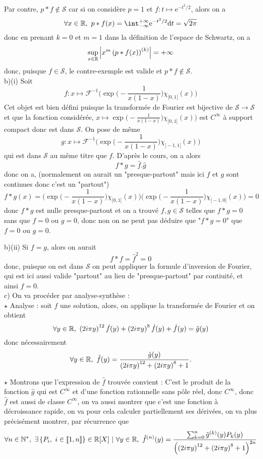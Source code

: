 \documentclass[a4paper,12pt,reqno]{amsart}
\newcommand{\dt}{\mathrm dt}
\newcommand{\inté}{\mathrm{int}\ }
\newcommand{\dstyle}{\displaystyle}
\newcommand{\intr}{\dstyle\int_{-\infty}^{+\infty}}
\newcommand{\ex}[1]{\mathrm{e}^{#1}}
\newcommand{\Par}[1]{\left(#1\right)}
\renewcommand{\abs}[1]{\left| #1 \right|}
\newcommand{\ens}[1]{\left\{#1\right\}}
\begin{document}
Par contre, $p*f\notin\mathcal S$ car si on considère $p=1$ et $f:t\mapsto \ex{-t^2/2}$, alors on a 
$$\forall x\in\R,\ p*f(x)=\intr\ex{-t^2/2}\dt=\sqrt{2\pi}$$
donc en prenant $k=0$ et $m=1$ dans la définition de l'espace de Schwartz, on a 
$$\underset{x\in\R}{\mathrm{sup}}\abs{x^m \Par{p*f(x)}^{(k)}}=+\infty$$
donc, puisque $f\in\mathcal S$, le contre-exemple est valide et $p*f\notin\mathcal S.$\\


b)(i) Soit 
$$f : x \mapsto \mathcal{F}^{-1} \bigg( \exp\bigg( -\frac{1}{x(1-x)} \bigg) \chi_{]0,1[}(x) \bigg)$$
Cet objet est bien défini puisque la transformée de Fourier est bijective de $\mathcal S\longrightarrow\mathcal S$ et que la fonction considérée, $x\mapsto \mathrm\exp\bigg( -\frac{1}{x(1-x)} \bigg) \chi_{]0,1[}(x) \bigg)$ est $C^\infty$ à support compact donc est dans $\mathcal S$. On pose de même 
$$g : x \mapsto \mathcal{F}^{-1} \bigg( \exp\bigg( -\frac{1}{x(1-x)} \bigg) \chi_{]-1,1[}(x) \bigg)$$
qui est dans $\mathcal S$ au même titre que $f$. D'après le cours, on a alors
$$f*g=\hat f.\hat g$$
donc on a, (normalement on aurait un "presque-partout" mais ici $f$ et $g$ sont continues donc c'est un "partout")
$$f*g(x)=\bigg( \exp\bigg( -\frac{1}{x(1-x)} \bigg) \chi_{]0,1[}(x) \bigg)\bigg( \exp\bigg( -\frac{1}{x(1-x)} \bigg) \chi_{]-1,0[}(x) \bigg)=0$$
donc $f*g$ est nulle presque-partout et on a trouvé $f,g\in\mathcal S$ telles que $f*g=0$ sans que $f=0$ ou $g=0$, donc non on ne peut pas déduire que "$f*g=0$" que $f=0$ ou $g=0$.

b)(ii) Si $f=g$, alors on aurait 
$$f*f=\hat f^2=0$$
donc, puisque on est dans $\mathcal S$ on peut appliquer la formule d'inversion de Fourier, qui est ici aussi valide "partout" au lieu de "presque-partout" par contiuité, et ainsi $f=0$.\\


c) On va procéder par analyse-synthèse :\\
$\star$ Analyse : soit $f$ une solution, alors, on applique la transformée de Fourier et on obtient 
$$\forall y\in\R,\ \Par{2i\pi y}^{12}\hat f(y)+\Par{2i\pi y}^{8}\hat f(y)+\hat f(y)=\hat g(y)$$
donc nécessairement
$$\forall y\in\R,\ \hat f(y)=\frac{\hat g(y)}{\Par{2i\pi y}^{12}+\Par{2i\pi y}^{8}+1}.$$


$\star$ Montrons que l'expression de $\hat f$ trouvée convient : 
C'est le produit de la fonction $\hat g$ qui est $C^\infty$ et d'une fonction rationnelle sans pôle réel, donc $C^\infty$, donc $\hat f$ est aussi de classe $C^\infty$, on va aussi montrer que c'est une fonction à décroissance rapide, on va pour cela calculer partiellement ses dérivées, on va plus précisément montrer, par récurrence que 
$$\forall n\in\N^*,\ \exists \ens{P_i,\ i\in[\![1,n]\!]}\in\R[X]\ |\ \forall y\in\R,\ \hat f^{(n)}(y)=\frac{\sum_{k=0}^n \hat g^{(k)}(y)P_k(y)}{\Par{\Par{2i\pi y }^{12}+\Par{2i\pi y }^{8}+1}^{2n}}$$
\end{document}
